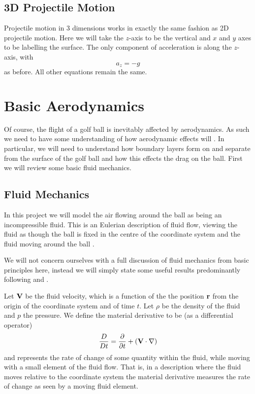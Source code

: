 \subsection{3D Projectile Motion}

Projectile motion in 3 dimensions works in exactly the same fashion as 2D projectile motion. Here we
will take the $z$-axis to be the vertical and $x$ and $y$ axes to be labelling the surface. The only
component of acceleration is along the $z$-axis, with
\[
a_z = -g
\]
as before. All other equations remain the same.

\section{Basic Aerodynamics}

Of course, the flight of a golf ball is inevitably affected by aerodynamics. As such we need to have
some understanding of how aerodynamic effects will . In particular, we will need to understand how boundary layers
form on and separate from the surface of the golf ball and how this effects the drag on the ball.
First we will review some basic fluid mechanics.

\subsection{Fluid Mechanics}

In this project we will model the air flowing around the ball as being an incompressible fluid. This
is an Eulerian description of fluid flow, viewing the fluid as though the ball is fixed in the centre
of the coordinate system and the fluid moving around the ball \citet{Ruban2014}.

We will not concern ourselves with a full discussion of fluid mechanics from basic principles here, 
instead we will simply state some useful results predominantly following \citet{Ruban2014} and 
\citet{sears}.

Let $\mathbf{V}$ be the fluid velocity, which is a function of the the position $\mathbf{r}$ from the origin of the
coordinate system and of time $t$. Let $\rho$ be the density of the fluid and $p$ the pressure. 
We define the material derivative to be (as a differential operator)
\begin{equation} \nonumber
\frac{D}{Dt} = \frac{\partial}{\partial t} + (\mathbf{V} \cdot \nabla)
\end{equation}
and represents the rate of change of some quantity within the fluid, while moving with a small element
of the fluid flow. That is, in a description where the fluid moves relative to the coordinate system
the material derivative measures the rate of change as seen by a moving fluid element.

